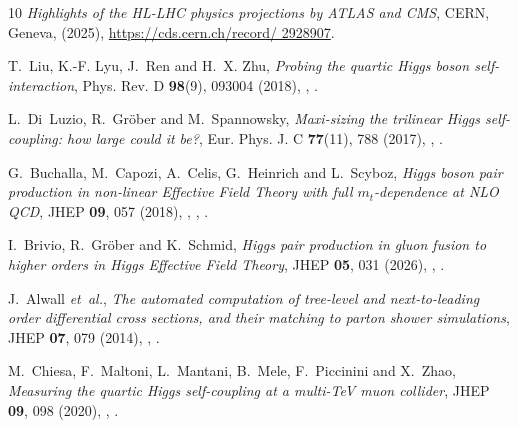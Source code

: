 \documentclass{SciPost}
\providecommand{\DIFaddtex}[1]{{\protect\color{red} #1}} %
\providecommand{\DIFdeltex}[1]{} %
\providecommand{\DIFaddbegin}{} %
\providecommand{\DIFaddend}{} %
\providecommand{\DIFdelbegin}{} %
\providecommand{\DIFdelend}{} %
\providecommand{\DIFadd}[1]{\texorpdfstring{\DIFaddtex{#1}}{#1}} %
\providecommand{\DIFdel}[1]{\texorpdfstring{\DIFdeltex{#1}}{}} %
\begin{document}
\begin{thebibliography}{10}
\emph{{Highlights of the HL-LHC physics projections by ATLAS and CMS}},
\newblock CERN, Geneva, (2025),
\newblock \DIFdelbegin %
\DIFdelend \DIFaddbegin \href{https://cds.cern.ch/record/2928907}{\DIFaddend https://cds.cern.ch/record/\DIFdelbegin \DIFdel{2929200}\DIFdelend \DIFaddbegin \DIFadd{2928907}\DIFaddend }.

T.~Liu, K.-F. Lyu, J.~Ren and H.~X. Zhu,
\newblock \emph{{Probing the quartic Higgs boson self-interaction}},
\newblock Phys. Rev. D \textbf{98}(9), 093004 (2018),
\newblock {},
\newblock {}.

L.~Di~Luzio, R.~Gr\"ober and M.~Spannowsky,
\newblock \emph{{Maxi-sizing the trilinear Higgs self-coupling: how large could it be?}},
\newblock Eur. Phys. J. C \textbf{77}(11), 788 (2017),
\newblock {},
\newblock {}.

G.~Buchalla, M.~Capozi, A.~Celis, G.~Heinrich and L.~Scyboz,
\newblock \emph{{Higgs boson pair production in non-linear Effective Field Theory with full $m_t$-dependence at NLO QCD}},
\newblock JHEP \textbf{09}, 057 (2018),
\newblock {},
,
\newblock {}.

I.~Brivio, R.~Gr{\"o}ber and K.~Schmid,
\newblock \emph{{Higgs pair production in gluon fusion to higher orders in Higgs Effective Field Theory}},
\newblock JHEP \textbf{05}, 031 (2026),
\newblock {},
\newblock {}\DIFaddbegin \DIFadd{.
}

\DIFadd{J.~Alwall \emph{et~al.},
}\newblock \DIFadd{\emph{{The automated computation of tree-level and next-to-leading order differential cross sections, and their matching to parton shower simulations}},
}\newblock \DIFadd{JHEP \textbf{07}, 079 (2014),
}\newblock {}\DIFadd{,
}\newblock {}\DIFaddend .

M.~Chiesa, F.~Maltoni, L.~Mantani, B.~Mele, F.~Piccinini and X.~Zhao,
\newblock \emph{{Measuring the quartic Higgs self-coupling at a multi-TeV muon collider}},
\newblock JHEP \textbf{09}, 098 (2020),
\newblock {},
\newblock {}.

\end{thebibliography}
\end{document}
